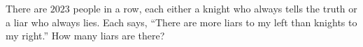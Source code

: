 There are $2023$ people in a row, each either a knight who always tells the truth or a liar who always lies. Each says, ``There are more liars to my left than knights to my right.'' How many liars are there?
